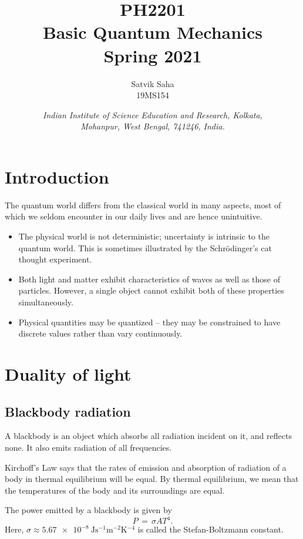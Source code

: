 \documentclass[11pt]{article}
\title{
    \Large\textsc{PH2201} \\
    \Huge \textbf{Basic Quantum Mechanics} \\
    \vspace{5pt}
    \Large{Spring 2021}
}
\author{
    \large Satvik Saha%
    \\\textsc{\small 19MS154}
}
\date{\normalsize
    \textit{Indian Institute of Science Education and Research, Kolkata, \\
    Mohanpur, West Bengal, 741246, India.} \\
}
\theoremstyle{definition}
\theoremstyle{remark}
\numberwithin{equation}{section}
\begin{document}
    \maketitle
    \tableofcontents

    \section{Introduction}
    The quantum world differs from the classical world in many aspects, most of
    which we seldom encounter in our daily lives and are hence unintuitive.
    \begin{itemize}
        \item The physical world is not deterministic; uncertainty is
        intrinsic to the quantum world.
        This is sometimes illustrated by the Schr\"odinger's cat thought
        experiment.
        \item Both light and matter exhibit characteristics of waves as well
        as those of particles.
        However, a single object cannot exhibit both of these properties 
        simultaneously.
        \item Physical quantities may be quantized -- they may be
        constrained to have discrete values rather than vary continuously.
    \end{itemize}

    \section{Duality of light}
    \subsection{Blackbody radiation}
    A blackbody is an object which absorbs all radiation incident on it, and
    reflects none. It also emits radiation of all frequencies.

    Kirchoff's Law says that the rates of emission and absorption of radiation of a
    body in thermal equilibrium will be equal. By thermal equilibrium, we mean that
    the temperatures of the body and its surroundings are equal.

    \begin{theorem}
        The power emitted by a blackbody is given by \[
            P \,=\, \sigma A T^4.
        \]
        Here, $\sigma \approx 
        \SI{5.67e-8}{\joule\second^{-1}\meter^{-2}\kelvin^{-4}}$ is called the
        Stefan-Boltzmann constant.
    \end{theorem}
\end{document}
